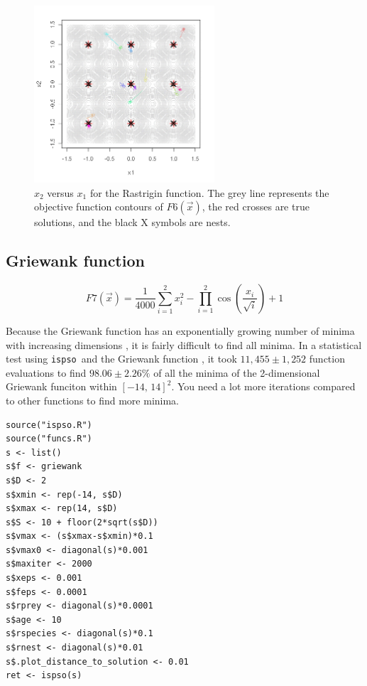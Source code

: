 \documentclass{article}
\def\ispso{\texttt{ispso}}
\begin{document}
\begin{figure}[htbp]
  \centering
  \includegraphics[width=0.6\textwidth]{rastrigin.png}
  \caption{$x_2$ versus $x_1$ for the Rastrigin function. The grey line represents the objective function contours of $F6(\vec{x})$, the red crosses are true solutions, and the black X symbols are nests.}
\end{figure}

\subsection{Griewank function}

\begin{equation*}
  F7(\vec{x})=
    \frac{1}{4000}\sum_{i=1}^2x_i^2
    -\prod_{i=1}^2\cos\left(\frac{x_i}{\sqrt{i}}\right)+1
\end{equation*}

Because the Griewank function has an exponentially growing number of minima with increasing dimensions \citep{Cho.ea.2008}, it is fairly difficult to find all minima.
In a statistical test using \ispso\ and the Griewank function \citep{Cho.2008}, it took $11,455\pm 1,252$ function evaluations to find $98.06\pm 2.26\%$ of all the minima of the 2-dimensional Griewank funciton within $[-14,\,14]^2$.
You need a lot more iterations compared to other functions to find more minima.

\begin{verbatim}
source("ispso.R")
source("funcs.R")
s <- list()
s$f <- griewank
s$D <- 2
s$xmin <- rep(-14, s$D)
s$xmax <- rep(14, s$D)
s$S <- 10 + floor(2*sqrt(s$D))
s$vmax <- (s$xmax-s$xmin)*0.1
s$vmax0 <- diagonal(s)*0.001
s$maxiter <- 2000
s$xeps <- 0.001
s$feps <- 0.0001
s$rprey <- diagonal(s)*0.0001
s$age <- 10
s$rspecies <- diagonal(s)*0.1
s$rnest <- diagonal(s)*0.01
s$.plot_distance_to_solution <- 0.01
ret <- ispso(s)
\end{verbatim}
\end{document}
